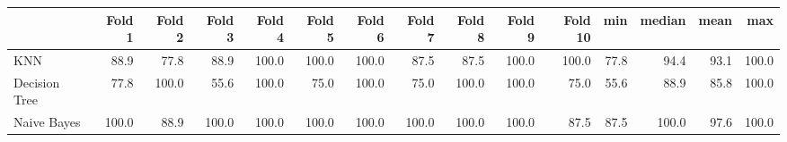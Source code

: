 \begin{tabular}{lrrrrrrrrrrrrrr}
\toprule
{} & Fold 1 & Fold 2 & Fold 3 & Fold 4 & Fold 5 & Fold 6 & Fold 7 & Fold 8 & Fold 9 & Fold 10 &   min & median &  mean &    max \\
\midrule
KNN           & 88.9 & 77.8 & 88.9 & 100.0 & 100.0 & 100.0 & 87.5 & 87.5 & 100.0 & 100.0 & 77.8 & 94.4 & 93.1 & 100.0 \\
Decision Tree & 77.8 & 100.0 & 55.6 & 100.0 & 75.0 & 100.0 & 75.0 & 100.0 & 100.0 & 75.0 & 55.6 & 88.9 & 85.8 & 100.0 \\
Naive Bayes   & 100.0 & 88.9 & 100.0 & 100.0 & 100.0 & 100.0 & 100.0 & 100.0 & 100.0 & 87.5 & 87.5 & 100.0 & 97.6 & 100.0 \\
\bottomrule
\end{tabular}

